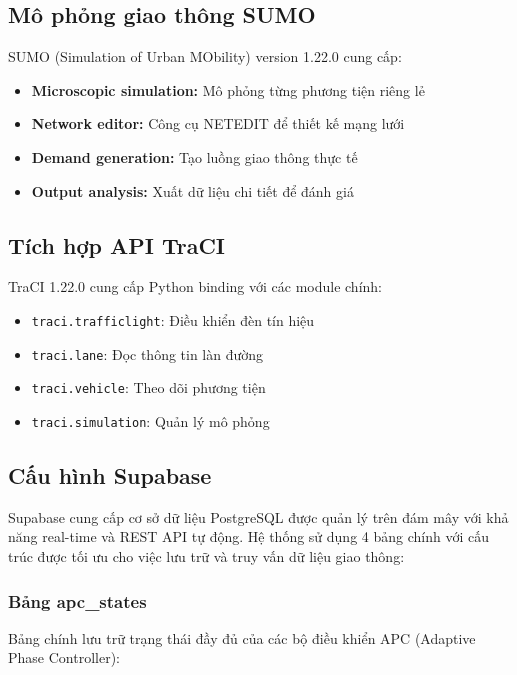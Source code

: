 \subsection{Mô phỏng giao thông SUMO}

SUMO (Simulation of Urban MObility) version 1.22.0 cung cấp:

\begin{itemize}
    \item \textbf{Microscopic simulation:} Mô phỏng từng phương tiện riêng lẻ
    \item \textbf{Network editor:} Công cụ NETEDIT để thiết kế mạng lưới
    \item \textbf{Demand generation:} Tạo luồng giao thông thực tế
    \item \textbf{Output analysis:} Xuất dữ liệu chi tiết để đánh giá
\end{itemize}

\subsection{Tích hợp API TraCI}

TraCI 1.22.0 cung cấp Python binding với các module chính:

\begin{itemize}
    \item \texttt{traci.trafficlight}: Điều khiển đèn tín hiệu
    \item \texttt{traci.lane}: Đọc thông tin làn đường
    \item \texttt{traci.vehicle}: Theo dõi phương tiện
    \item \texttt{traci.simulation}: Quản lý mô phỏng
\end{itemize}

\subsection{Cấu hình Supabase}

Supabase cung cấp cơ sở dữ liệu PostgreSQL được quản lý trên đám mây với khả năng real-time và REST API tự động. Hệ thống sử dụng 4 bảng chính với cấu trúc được tối ưu cho việc lưu trữ và truy vấn dữ liệu giao thông:

\subsubsection{Bảng apc\_states}

Bảng chính lưu trữ trạng thái đầy đủ của các bộ điều khiển APC (Adaptive Phase Controller):

